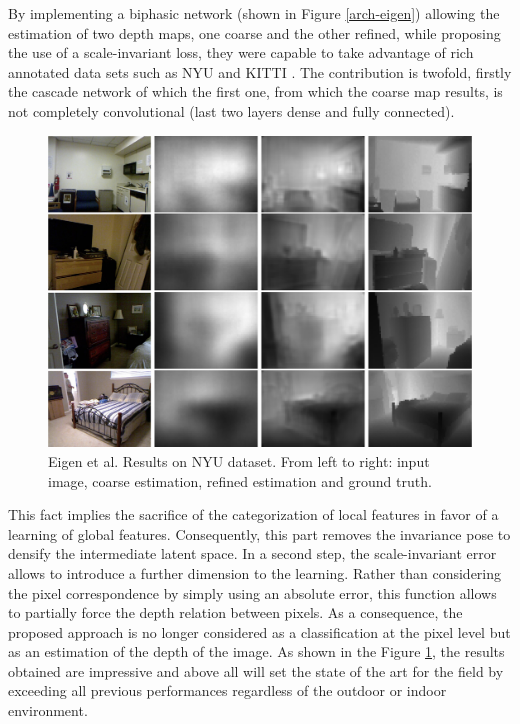 By implementing a biphasic network (shown in Figure \ref{arch-eigen}) allowing the estimation of two depth maps, one coarse and the other refined, while proposing the use of a scale-invariant loss, they were capable to take advantage of rich annotated data sets such as NYU \cite{SilbermanECCV12} and KITTI \cite{Geiger2012CVPR,Fritsch2013ITSC,Menze2015CVPR}.
The contribution is twofold, firstly the cascade network of which the first one, from which the coarse map results, is not completely convolutional (last two layers dense and fully connected). 


\begin{figure}[h]
	\centering
	\includegraphics[width=0.8\linewidth]{Figures/SOA/ref-eigen}
	\caption[Eigen et al. Results on NYU dataset.]{Eigen et al. Results on NYU dataset. From left to right: input image, coarse estimation, refined estimation and ground truth.}
	\label{ref-eigen}
\end{figure}

This fact implies the sacrifice of the categorization of local features in favor of a learning of global features. Consequently, this part removes the invariance pose to densify the intermediate latent space.
In a second step, the scale-invariant error allows to introduce a further dimension to the learning. Rather than considering the pixel correspondence by simply using an absolute error, this function allows to partially force the depth relation between pixels. As a consequence, the proposed approach is no longer considered as a classification at the pixel level but as an estimation of the depth of the image.
As shown in the Figure \ref{ref-eigen}, the results obtained are impressive and above all will set the state of the art for the field by exceeding all previous performances regardless of the outdoor or indoor environment.


